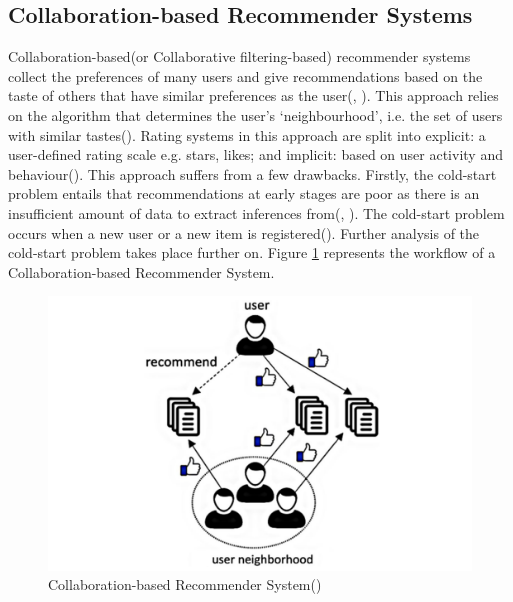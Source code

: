 \documentclass{l4proj}
\begin{document}
\subsection{Collaboration-based Recommender Systems}
Collaboration-based(or Collaborative filtering-based) recommender systems collect the preferences of many users and give recommendations based on the taste of others that have similar preferences as the user(\cite{Paul_Kundu_2019}, \cite{Roy_Dutta_2022}). This approach relies on the algorithm that determines the user's `neighbourhood', i.e. the set of users with similar tastes(\cite{Roy_Dutta_2022}). Rating systems in this approach are split into explicit: a user-defined rating scale e.g. stars, likes; and implicit: based on user activity and behaviour(\cite{Paul_Kundu_2019}). This approach suffers from a few drawbacks. Firstly, the cold-start problem entails that recommendations at early stages are poor as there is an insufficient amount of data to extract inferences from(\cite{Paul_Kundu_2019}, \cite{Roy_Dutta_2022}). The cold-start problem occurs when a new user or a new item is registered(\cite{Schedl_Zamani_Chen_Deldjoo_Elahi_2018}). Further analysis of the cold-start problem takes place further on. Figure \ref{fig:collab-based} represents the workflow of a Collaboration-based Recommender System.
\begin{figure}
    \centering
    \includegraphics[width=0.55\linewidth]{images/Collab-based-RS.png}
    \caption{Collaboration-based Recommender System(\cite{Roy_Dutta_2022})}
    \label{fig:collab-based}
\end{figure}
\end{document}
